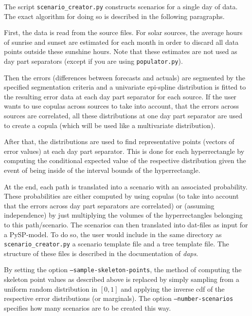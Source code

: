 \documentclass[11pt]{article}
\begin{document}
The script \texttt{scenario\_creator.py} constructs scenarios for a single day of data. The exact algorithm for doing so is described in the following paragraphs.

First, the data is read from the source files. For solar sources, the average hours of sunrise and sunset are estimated for each month in order to discard all data points outside these sunshine hours. Note that these estimates are not used as day part separators (except if you are using \texttt{populator.py}).

Then the errors (differences between forecasts and actuals) are segmented by the specified segmentation criteria and a univariate epi-spline distribution is fitted to the resulting error data at each day part separator for each source. If the user wants to use copulas across sources to take into account, that the errors across sources are correlated, all these distributions at one day part separator are used to create a copula (which will be used like a multivariate distribution). 

After that, the distributions are used to find representative points (vectors of error values) at each day part separator. This is done for each hyperrectangle by computing the conditional expected value of the respective distribution given the event of being inside of the interval bounds of the hyperrectangle.

At the end, each path is translated into a scenario with an associated probability. These probabilities are either computed by using copulas (to take into account that the errors across day part separators are correlated) or (assuming independence) by just multiplying the volumes of the hyperrectangles belonging to this path/scenario. The scenarios can then translated into dat-files as input for a PySP-model. To do so, the user would include in the same directory as \texttt{scenario\_creator.py} a scenario template file and a tree template file. The structure of these files is described in the documentation of \textit{daps}.

By setting the option \texttt{--sample-skeleton-points}, the method of computing the skeleton point values as described above is replaced by simply sampling from a uniform random distribution in $[0,1]$ and applying the inverse cdf of the respective error distributions (or marginals). The option \texttt{--number-scenarios} specifies how many scenarios are to be created this way.
\bigskip
\end{document}
